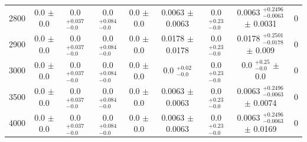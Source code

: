 \begin{table}[H]
\begin{center}
\begin{tabular}{ccccccccc}
            2800  &    	0.0 $\pm$ 0.0  &      	 0.0 $ _{-0.0}^{+0.037}$   &	 0.0 $ _{-0.0}^{+0.084}$   &	 0.0 $\pm$ 0.0  &      	 0.0063 $\pm$ 0.0063  &         0.0 $ _{-0.0}^{+0.23}$   &      0.0063 $ _{-0.0063}^{+0.2496}$   $\pm$ 0.0031  &    0 \\
            2900  &    	0.0 $\pm$ 0.0  &      	 0.0 $ _{-0.0}^{+0.037}$   &	 0.0 $ _{-0.0}^{+0.084}$   &	 0.0 $\pm$ 0.0  &      	 0.0178 $\pm$ 0.0178  &         0.0 $ _{-0.0}^{+0.23}$   &      0.0178 $ _{-0.0178}^{+0.2501}$   $\pm$ 0.009  &     0 \\
            3000  &    	0.0 $\pm$ 0.0  &      	 0.0 $ _{-0.0}^{+0.037}$   &	 0.0 $ _{-0.0}^{+0.084}$   &	 0.0 $\pm$ 0.0  &      	 0.0 $ _{-0.0}^{+0.02}$   &     0.0 $ _{-0.0}^{+0.23}$   &      0.0 $ _{-0.0}^{+0.25}$   $\pm$ 0.0  &               0 \\
            3500  &    	0.0 $\pm$ 0.0  &      	 0.0 $ _{-0.0}^{+0.037}$   &	 0.0 $ _{-0.0}^{+0.084}$   &	 0.0 $\pm$ 0.0  &      	 0.0063 $\pm$ 0.0063  &         0.0 $ _{-0.0}^{+0.23}$   &      0.0063 $ _{-0.0063}^{+0.2496}$   $\pm$ 0.0074  &    0 \\
            4000  &    	0.0 $\pm$ 0.0  &      	 0.0 $ _{-0.0}^{+0.037}$   &	 0.0 $ _{-0.0}^{+0.084}$   &	 0.0 $\pm$ 0.0  &      	 0.0063 $\pm$ 0.0063  &         0.0 $ _{-0.0}^{+0.23}$   &      0.0063 $ _{-0.0063}^{+0.2496}$   $\pm$ 0.0169  &    0 \\
            \hline \hline
        \end{tabular}
        \label{tab:eventyields2018}
    \end{center}
\end{table}


